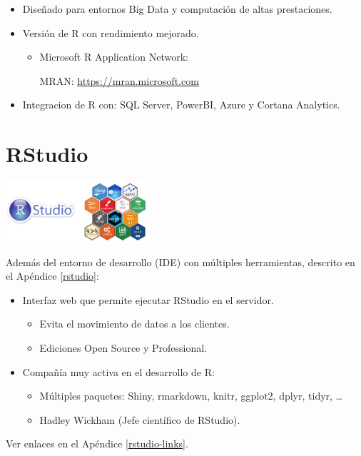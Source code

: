 \documentclass[]{book}
\begin{document}
\begin{itemize}
\item
  Diseñado para entornos Big Data y computación de altas prestaciones.
\item
  Versión de R con rendimiento mejorado.

  \begin{itemize}
  \item
    Microsoft R Application Network:

    MRAN: \url{https://mran.microsoft.com}
  \end{itemize}
\item
  Integracion de R con: SQL Server, PowerBI, Azure y Cortana
  Analytics.
\end{itemize}

\hypertarget{rstudio-com}{%
\section{RStudio}\label{rstudio-com}}

\includegraphics[width=0.4\textwidth,height=\textheight]{figuras/rstudio_stickers.png}

Además del entorno de desarrollo (IDE) con múltiples herramientas,
descrito en el Apéndice \ref{rstudio}:

\begin{itemize}
\item
  Interfaz web que permite ejecutar RStudio en el servidor.

  \begin{itemize}
  \item
    Evita el movimiento de datos a los clientes.
  \item
    Ediciones Open Source y Professional.
  \end{itemize}
\item
  Compañía muy activa en el desarrollo de R:

  \begin{itemize}
  \item
    Múltiples paquetes: Shiny, rmarkdown, knitr, ggplot2, dplyr, tidyr, \ldots{}
  \item
    Hadley Wickham (Jefe científico de RStudio).
  \end{itemize}
\end{itemize}

Ver enlaces en el Apéndice \ref{rstudio-links}.


\end{document}
